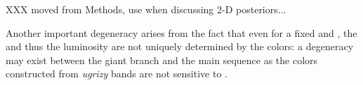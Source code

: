  



XXX moved from Methods, use when discussing 2-D posteriors...

Another important degeneracy arises from the fact that even for a fixed \teff and \feh, the \logg and thus the luminosity are not uniquely determined by the colors: a degeneracy may exist between the giant branch and the main sequence as the colors constructed from \textit{ugrizy} bands are not sensitive to \logg. 
 